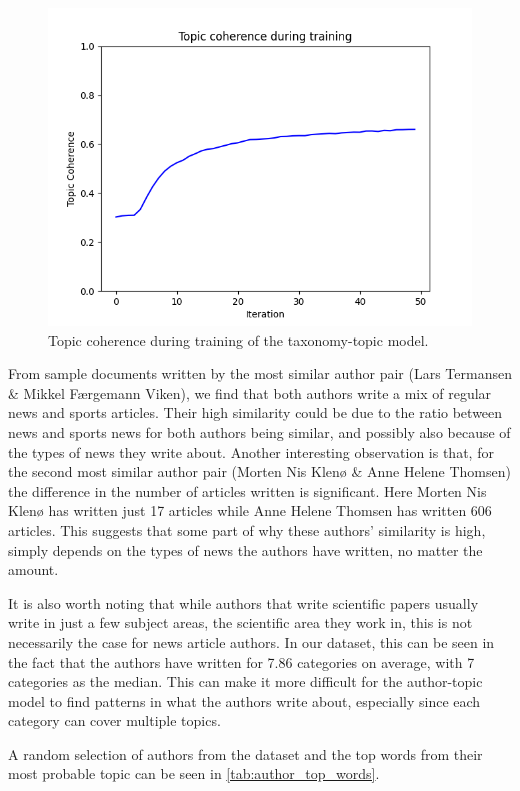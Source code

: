 \begin{figure}[b]
	\centering
	\includegraphics[width= \linewidth]{figures/pachinko_training.PNG}
	\caption{Topic coherence during training of the taxonomy-topic model.}
	\label{fig:pachinko_train}
\end{figure}

From sample documents written by the most similar author pair (Lars Termansen \& Mikkel Færgemann Viken), we find that both authors write a mix of regular news and sports articles.
Their high similarity could be due to the ratio between news and sports news for both authors being similar, and possibly also because of the types of news they write about.
Another interesting observation is that, for the second most similar author pair (Morten Nis Klenø \& Anne Helene Thomsen) the difference in the number of articles written is significant.
Here Morten Nis Klenø has written just 17 articles while Anne Helene Thomsen has written 606 articles.
This suggests that some part of why these authors' similarity is high, simply depends on the types of news the authors have written, no matter the amount.

It is also worth noting that while authors that write scientific papers usually write in just a few subject areas, the scientific area they work in, this is not necessarily the case for news article authors.
In our dataset, this can be seen in the fact that the authors have written for 7.86 categories on average, with 7 categories as the median.
This can make it more difficult for the author-topic model to find patterns in what the authors write about, especially since each category can cover multiple topics.

A random selection of authors from the dataset and the top words from their most probable topic can be seen in \autoref{tab:author_top_words}.